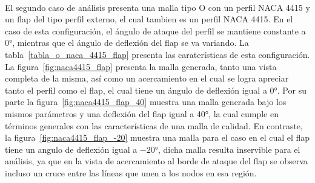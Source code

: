 \documentclass[letterpaper, openright, 12pt]{book}
\begin{document}
    \paragraph*{}
        El segundo caso de análisis presenta una malla tipo O con un perfil
        NACA 4415 y un flap del tipo perfil externo, el cual tambien es un
        perfil NACA 4415. En el caso de esta configuración, el ángulo de ataque
        del perfil se mantiene constante a 0\si{\degree}, mientras que el ángulo
        de deflexión del flap se va variando. La tabla~\ref{tabla_o_naca_4415_flap}
        presenta las  caraterísticas de esta configuración. La
        figura~\ref{fig:naca4415_flap} presenta la malla generada, tanto una
        vista completa de la misma, así como un acercamiento en el cual se logra
        apreciar tanto el perfil como el flap, el cual tiene un ángulo de
        deflexión igual a 0\si{\degree}. Por su parte la
        figura~\ref{fig:naca4415_flap_40} muestra una malla generada bajo los
        mismos parámetros y una deflexión del flap igual a 40\si{\degree}, la
        cual cumple en términos generales con las características de una malla
        de calidad. En contraste, la figura~\ref{fig:naca4415_flap_-20} muestra
        una malla para el caso en el cual el flap tiene un angulo de deflexión
        igual a $-20\si{\degree}$, dicha malla resulta inservible para el
        análisis, ya que en la vista de acercamiento al borde de ataque del flap
        se observa incluso un cruce entre las líneas que unen a los nodos en esa
        región.
\end{document}
